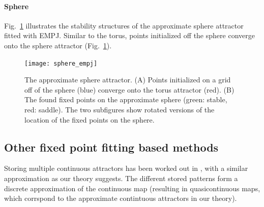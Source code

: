 \documentclass{article} %
\newcounter{ct}
\theoremstyle{definition}
\theoremstyle{remark}
\begin{document}
\paragraph{Sphere}
Fig.~\ref{fig:sphere_empj} illustrates the stability structures of  the approximate sphere  attractor fitted with EMPJ.
Similar to the torus,  points initialized off the sphere converge onto the sphere attractor (Fig.~\ref{fig:sphere_empj}).
\begin{figure}[h]
\centering
\texttt{[image: sphere\_empj]}
\caption{The approximate sphere attractor.
(A)  Points initialized on a grid off of the sphere (blue) converge onto the torus attractor (red).
(B) The found fixed points on the approximate sphere (green: stable, red: saddle).
 The two subfigures show rotated versions of the location of the fixed points on the sphere.
}\label{fig:sphere_empj}
\end{figure}





\subsection{Other fixed point fitting based methods}

Storing multiple continuous attractors has been worked out in \citep{battista2020capacity}, with a similar approximation as our theory suggests. The different stored patterns form a discrete approximation of the continuous map (resulting in quasicontinuous maps, which corrspond to the approximate contintuous attractors in our theory).






%
%
%
%




%
%
%
\end{document}
